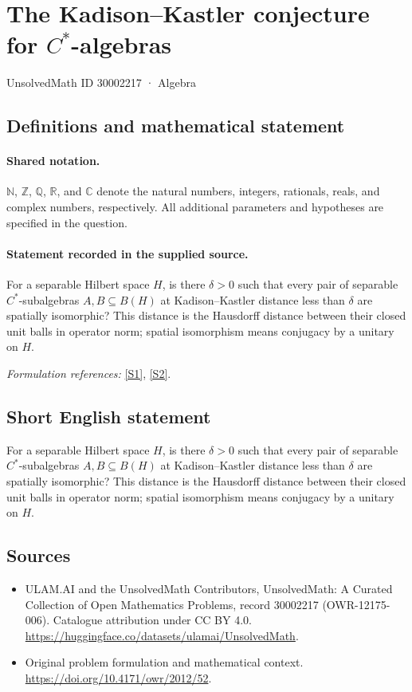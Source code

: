 \documentclass[11pt]{article}
\newcommand{\sref}[2]{\hyperlink{source:#1:#2}{[S#2]}}
\begin{document}
\setcounter{section}{30002216}
\section{\texorpdfstring{The Kadison–Kastler conjecture for $C^*$-algebras}{The Kadison–Kastler conjecture for C\textasciicircum{}*-algebras}}\label{30002217}
{\small UnsolvedMath ID 30002217 · Algebra}
\subsection{Definitions and mathematical statement}

\paragraph{Shared notation.}$\mathbb N$, $\mathbb Z$, $\mathbb Q$, $\mathbb R$, and $\mathbb C$ denote the natural numbers, integers, rationals, reals, and complex numbers, respectively. All additional parameters and hypotheses are specified in the question.


\paragraph{Statement recorded in the supplied source.}
For a separable Hilbert space $H$, is there $\delta>0$ such that every pair of separable $C^*$-subalgebras $A,B\subseteq B(H)$ at Kadison--Kastler distance less than $\delta$ are spatially isomorphic? This distance is the Hausdorff distance between their closed unit balls in operator norm; spatial isomorphism means conjugacy by a unitary on $H$.
\par\smallskip\textit{Formulation references:} \sref{30002217}{1}, \sref{30002217}{2}.
\subsection{Short English statement}
For a separable Hilbert space $H$, is there $\delta>0$ such that every pair of separable $C^*$-subalgebras $A,B\subseteq B(H)$ at Kadison--Kastler distance less than $\delta$ are spatially isomorphic? This distance is the Hausdorff distance between their closed unit balls in operator norm; spatial isomorphism means conjugacy by a unitary on $H$.
\subsection{Sources}
\begin{itemize}
\item[\hypertarget{source:30002217:1}{S1}] ULAM.AI and the UnsolvedMath Contributors, UnsolvedMath: A Curated Collection of Open Mathematics Problems, record 30002217 (OWR-12175-006). Catalogue attribution under CC BY 4.0.
\url{https://huggingface.co/datasets/ulamai/UnsolvedMath}.
\item[\hypertarget{source:30002217:2}{S2}] Original problem formulation and mathematical context.
\url{https://doi.org/10.4171/owr/2012/52}.
\end{itemize}
\label{end:30002217}
\end{document}
